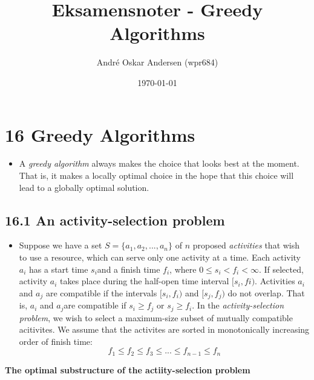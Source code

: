 \documentclass{report}
\title{Eksamensnoter - Greedy Algorithms}
\author{André Oskar Andersen (wpr684)}
\date{\today}
\begin{document}
\maketitle

\section*{16 Greedy Algorithms}
\begin{itemize}
    \item A \textit{greedy algorithm} always makes the choice that looks best at the moment. That is, it makes a locally optimal choice in the hope that this choice will lead to a globally optimal solution.
\end{itemize}
\subsection*{16.1 An activity-selection problem}
\begin{itemize}
    \item Suppose we have a set $S = \{a_1, a_2, ..., a_n\}$ of $n$ proposed \textit{activities} that wish to use a resource, which can serve only one activity at a time. Each activity $a_i$ has a start time $s_i$and a finish time $f_i$, where $0 \leq s_i < f_i < \infty$. If selected, activity $a_i$ takes place during the half-open time interval $[s_i, fi)$. Activities $a_i$ and $a_j$ are compatible if the intervals $[s_i, f_i)$ and $[s_j, f_j)$ do not overlap. That is, $a_i$ and $a_j$are compatible if $s_i \geq f_j$ or $s_j \geq f_i$. In the \textit{activity-selection problem}, we wish to select a maximum-size subset of mutually compatible acitivites. We assume that the activites are sorted in monotonically increasing order of finish time: 
    $$f_1 \leq f_2 \leq f_3 \leq ... \leq f_{n - 1} \leq f_n$$
\end{itemize}
\textbf{The optimal substructure of the actiity-selection problem}
\end{document}
